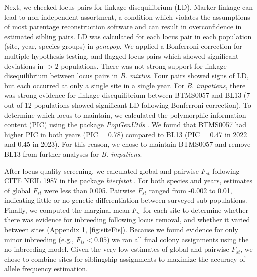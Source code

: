 \documentclass[12pt]{article}
\begin{document}
Next, we checked locus pairs for linkage disequilibrium (LD). Marker linkage can lead to non-independent assortment, a condition which violates the assumptions of most parentage reconstruction software and can result in overconfidence in estimated sibling pairs. LD was calculated for each locus pair in each population (site, year, species groups) in \emph{genepop}. We applied a Bonferroni correction for multiple hypothesis testing, and flagged locus pairs which showed significant deviations in $>2$ populations. There was not strong support for linkage disequilibrium between locus pairs in \emph{B. mixtus}. Four pairs showed signs of LD, but each occurred at only a single site in a single year. For \emph{B. impatiens}, there was strong evidence for linkage disequilibrium between BTMS0057 and BL13 (7 out of 12 populations showed significant LD following Bonferroni correction). To determine which locus to maintain, we calculated the polymorphic information content (PIC) using the package \emph{PopGenUtils} \parencite{tourvasPopGenUtilsCollectionUseful2025}. We found that BTMS0057 had higher PIC in both years (PIC = 0.78) compared to BL13 (PIC = 0.47 in 2022 and 0.45 in 2023). For this reason, we chose to maintain BTMS0057 and remove BL13 from further analyses for \emph{B. impatiens}.

After locus quality screening, we calculated global and pairwise $F_{st}$ following CITE NEIL 1987 in the package \emph{hierfstat} \parencite{goudetHierfstatPackageCompute2005}. For both species and years, estimates of global $F_{st}$ were less than 0.005. Pairwise $F_{st}$ ranged from -0.002 to 0.01, indicating little or no genetic differentiation between surveyed sub-populations. Finally, we computed the marginal mean $F_{is}$ for each site to determine whether there was evidence for inbreeding following locus removal, and whether it varied between sites (Appendix 1, \ref{fig:siteFis}).
Because we found evidence for only minor inbreeding (e.g., $F_{is} < 0.05$) we ran all final colony assignments using the no-inbreeding model. Given the very low estimates of global and pairwise $F_{st}$, we chose to combine sites for siblingship assignments to maximize the accuracy of allele frequency estimation.
\end{document}
